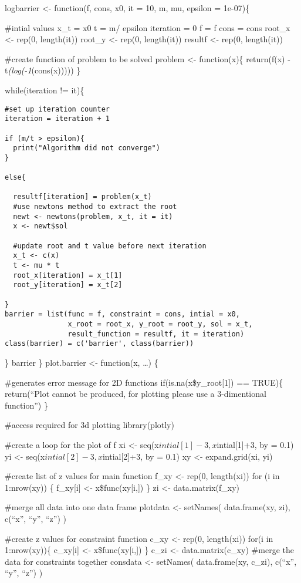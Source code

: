 \documentclass[]{article}
\begin{document}
{{logbarrier \textless{}- function(f, cons, x0, it = 10, m, mu, epsilon =
1e-07)\{

\#intial values x\_t = x0 t = m/ epsilon iteration = 0 f = f cons = cons
root\_x \textless{}- rep(0, length(it)) root\_y \textless{}- rep(0,
length(it)) resultf \textless{}- rep(0, length(it))

\#create function of problem to be solved problem \textless{}-
function(x)\{ return(f(x) - t\emph{(log(-1}(cons(x))))) \}

while(iteration != it)\{

\begin{verbatim}
#set up iteration counter
iteration = iteration + 1

if (m/t > epsilon){
  print("Algorithm did not converge")
}

else{

  resultf[iteration] = problem(x_t)
  #use newtons method to extract the root
  newt <- newtons(problem, x_t, it = it)
  x <- newt$sol

  #update root and t value before next iteration
  x_t <- c(x)
  t <- mu * t
  root_x[iteration] = x_t[1]
  root_y[iteration] = x_t[2]

}
barrier = list(func = f, constraint = cons, intial = x0,
               x_root = root_x, y_root = root_y, sol = x_t,
               result_function = resultf, it = iteration)
class(barrier) = c('barrier', class(barrier))
\end{verbatim}

\} barrier \} plot.barrier \textless{}- function(x, \ldots{}) \{

\#generates error message for 2D functions if(is.na(x\$y\_root{[}1{]})
== TRUE)\{ return(``Plot cannot be produced, for plotting please use a
3-dimentional function'') \}

\#access required for 3d plotting library(plotly)

\#create a loop for the plot of f xi \textless{}-
seq(x\(intial[1] -3, x\)intial{[}1{]}+3, by = 0.1) yi \textless{}-
seq(x\(intial[2]-3, x\)intial{[}2{]}+3, by = 0.1) xy \textless{}-
expand.grid(xi, yi)

\#create list of z values for main function f\_xy \textless{}- rep(0,
length(xi)) for (i in 1:nrow(xy)) \{ f\_xy{[}i{]} \textless{}-
x\$func(xy{[}i,{]}) \} zi \textless{}- data.matrix(f\_xy)

\#merge all data into one data frame plotdata \textless{}- setNames(
data.frame(xy, zi), c(``x'', ``y'', ``z'') )

\#create z values for constraint function c\_xy \textless{}- rep(0,
length(xi)) for(i in 1:nrow(xy))\{ c\_xy{[}i{]} \textless{}-
x\$func(xy{[}i,{]}) \} c\_zi \textless{}- data.matrix(c\_xy) \#merge the
data for constraints together consdata \textless{}- setNames(
data.frame(xy, c\_zi), c(``x'', ``y'', ``z'') )

}}
\end{document}
